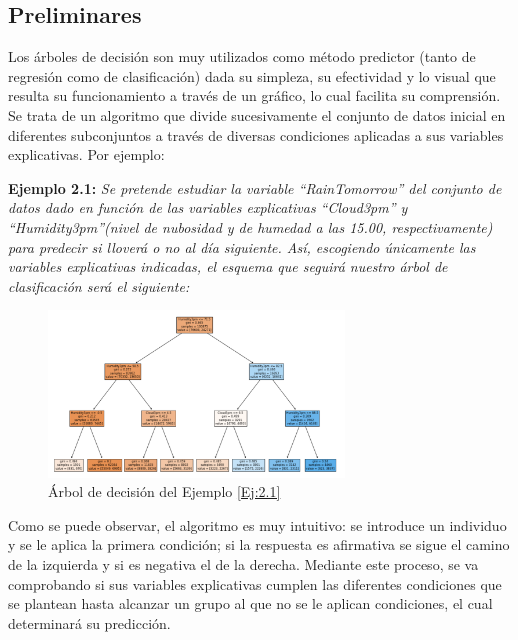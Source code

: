 \documentclass[12pt,twoside]{article}
\begin{document}
\subsection{Preliminares}

Los árboles de decisión son muy utilizados como método predictor (tanto de regresión como de clasificación) dada su simpleza, su efectividad y lo visual que resulta su funcionamiento a través de un gráfico, lo cual facilita su comprensión. Se trata de un algoritmo que divide sucesivamente el conjunto de datos inicial en diferentes subconjuntos a través de diversas condiciones aplicadas a sus variables explicativas. Por ejemplo:

\textbf{Ejemplo 2.1: } \label{Ej:2.1} \emph{Se pretende estudiar la variable ``RainTomorrow'' del conjunto de datos dado en función de las variables explicativas ``Cloud3pm'' y ``Humidity3pm''(nivel de nubosidad y de humedad a las 15.00, respectivamente) para predecir si lloverá o no al día siguiente. Así, escogiendo únicamente las variables explicativas indicadas, el esquema que seguirá nuestro árbol de clasificación será el siguiente: }
\begin{figure}[h]
	\centering
	\includegraphics[width = 0.7\textwidth]{ex2_1_01}
	\caption{Árbol de decisión del Ejemplo \ref{Ej:2.1}}
	\label{fig:Ejemplo 2.1}
\end{figure}

Como se puede observar, el algoritmo es muy intuitivo: se introduce un individuo y se le aplica la primera condición; si la respuesta es afirmativa se sigue el camino de la izquierda y si es negativa el de la derecha. Mediante este proceso, se va comprobando si sus variables explicativas cumplen las diferentes condiciones que se plantean hasta alcanzar un grupo al que no se le aplican condiciones, el cual determinará su predicción.
\end{document}
